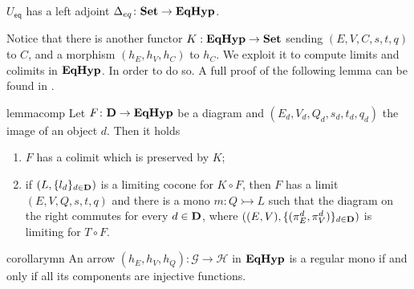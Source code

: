 \documentclass[a4paper,UKenglish,cleveref,pdftex,thm-restate,numberwithinsect]{lipics-v2021}
\newcommand{\eq}{\mathsf{eq}}
\newcommand{\Set}{\mathbf{Set}}
\def\D{\textbf {\textup{D}}}
\newcommand{\catname}[1]{\textbf{\textup{#1}}}
\newcommand{\EqHyp}{\catname{EqHyp}} %
\newcommand{\mto}{\rightarrowtail}
\begin{document}
\begin{corollary}\label{cor:ladj}
	$U_{\eq}$ has a left adjoint $\Delta_{\eq}\colon \Set \to \EqHyp$.
\end{corollary}

Notice that there is another functor $K: \EqHyp \to \Set$ sending $(E, V, C, s, t, q)$ to $C$, and a morphism $(h_E, h_V, h_C)$ to $h_C$. We  exploit it to compute limits and colimits in $\EqHyp$. In order to do so. A full proof of the following lemma can be found in .

\noindent
\parbox{11.4cm}{
\begin{restatable}{lemma}{comp}\label{prop:eqhyp_complete}
Let $F\colon \D \to \EqHyp$ be a diagram and $(E_d, V_d, Q_d, s_d, t_d, q_d)$ the image of an object $d$. Then it holds
\begin{enumerate}
		\item $F$ has a colimit which is preserved by $K$;
	\item if $(L, \{l_d\}_{d\in \D})$ is a limiting cocone for $K \circ F$, then $F$ has a limit $(E, V, Q, s, t, q)$ and there is a mono $m\colon Q\mto L$ such that the diagram on the right commutes for every $d\in \D$, where $((E, V), \{(\pi^d_E, \pi^d_V)\}_{d\in \D})$ is limiting for $T\circ F$.
\end{enumerate}
\end{restatable}}\hfill 
\parbox{3cm}{}   

\begin{restatable}{corollary}{mn}\label{cor:mono2}
	An arrow $(h_E, h_V, h_Q): \mathcal{G\to H}$ in $\EqHyp$ is a regular mono if and only if all its components are injective functions.
\end{restatable}
\end{document}
